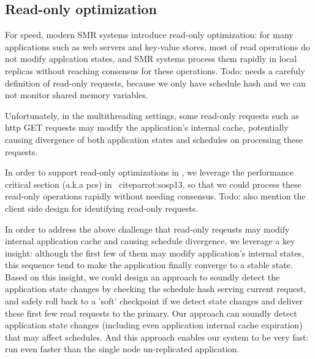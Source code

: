 
\subsection{Read-only optimization} \label{sec:rep-readonly}
For speed, modern SMR systems introduce read-only optimization: for many applications such as web servers and key-value stores,
 most of read operations do not modify applcation states, and SMR systems process them rapidly in 
local replicas without reaching consensus for these operations. Todo: needs a 
carefuly definition of read-only requests, because we only have schedule hash 
and we can not monitor shared memory variables.

Unfortunately, in the multithreading settings, some read-only requests such as http GET requests may
modify the application's internal cache, potentially causing divergence of both application states and 
schedules on processing these requests.

In order to support read-only optimizations in \msmr, we leverage the performance critical 
section (a.k.a pcs) in \parrot~cite{parrot:sosp13}, so that we could process 
these read-only operations rapidly without needing consensus. Todo: also 
mention the client side design for identifying read-only requests.

In order to address the above challenge that read-only reqeusts may modify internal 
application cache and causing schedule divergence, we leverage a key 
insight: although the first few of them may modify application's internal states, this 
sequence tend to make the application finally converge to a stable state. Based 
on this insight, we could design an approach to soundly detect the application 
state changes by checking the schedule hash serving current request, and 
safely roll back to a 'soft' checkpoint if we detect state changes and 
deliver these first few read requests to the primary. Our approach can soundly 
detect application state changes (including even application internal cache 
expiration) that may affect schedules. And this approach enables our system 
to be very fast: run even faster than the single node un-replicated 
application.

